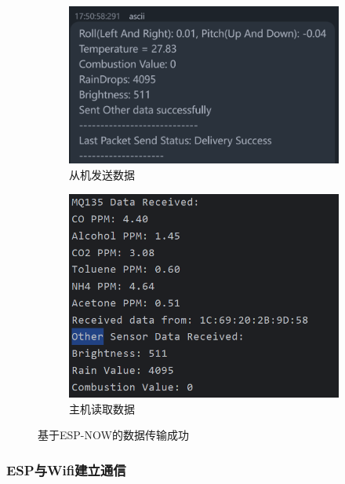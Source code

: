 \begin{figure}[H]
    \centering
    \begin{subfigure}[b]{0.42\textwidth}
        \centering
        \includegraphics[width=\textwidth]{img/ESP32-Slave-SendData.png}
        \caption{从机发送数据}
        \label{fig:DHT22_active}
    \end{subfigure}
    \hspace{4em}
    \begin{subfigure}[b]{0.325\textwidth}
        \centering
        \includegraphics[width=\textwidth]{img/ESP-Master-ReceivedData.png}
        \caption{主机读取数据}
        \label{fig:MPU6050_active}
    \end{subfigure}
    \caption{基于ESP-NOW的数据传输成功}
    \label{fig:combined}
\end{figure}

\subsubsection{ESP与Wifi建立通信}

